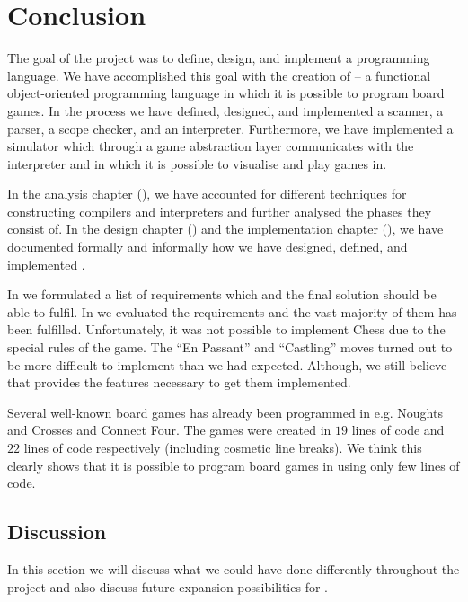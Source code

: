 \chapter{Conclusion}
\label{chap:conclusion}

The goal of the project was to define, design, and implement a programming
language.  We have accomplished this goal with the creation of \productname{} --
a functional object-oriented programming language in which it is possible to
program board games. In the process we have defined, designed, and implemented
a scanner, a parser, a scope checker, and an interpreter. Furthermore, we have
implemented a simulator which through a game abstraction layer communicates with
the interpreter and in which it is possible to visualise and play
\productname{} games in.

In the analysis chapter (), we have accounted for
different techniques for constructing compilers and interpreters and further
analysed the phases they consist of. In the design chapter
() and the implementation chapter
(), we have documented formally and informally how
we have designed, defined, and implemented \productname{}.

In  we formulated a list of requirements which
\productname{} and the final solution should be able to fulfil. In
 we evaluated the requirements and the vast
majority of them has been fulfilled. Unfortunately, it was not possible to
implement Chess due to the special rules of the game. The ``En Passant''
and ``Castling'' moves turned out to be more difficult to implement than we
had expected. Although, we still believe that \productname{} provides the
features necessary to get them implemented.

Several well-known board games has already been programmed in \productname{} e.g. Noughts and
Crosses and Connect Four. The games were created in $19$ lines of code and $22$ lines of code respectively (including cosmetic line breaks). We think this clearly shows that it is possible to program board games in \productname{} using only few lines of code.

\section{Discussion}
\label{sec:discussion}

In this section we will discuss what we could have done differently throughout
the project and also discuss future expansion possibilities for \productname{}.

%






